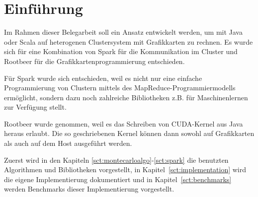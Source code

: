 \chapter{Einführung}

Im Rahmen dieser Belegarbeit soll ein Ansatz entwickelt werden, um mit Java oder Scala auf heterogenen Clustersystem mit Grafikkarten zu rechnen. Es wurde sich für eine Kombination von Spark für die Kommunikation im Cluster und Rootbeer für die Grafikkartenprogrammierung entschieden.

Für Spark wurde sich entschieden, weil es nicht nur eine einfache Programmierung von Clustern mittels des MapReduce-Programmiermodells ermöglicht, sondern dazu noch zahlreiche Bibliotheken z.B. für Maschinenlernen zur Verfügung stellt.

Rootbeer wurde genommen, weil es das Schreiben von CUDA-Kernel aus Java heraus erlaubt. Die so geschriebenen Kernel können dann sowohl auf Grafikkarten als auch auf dem Host ausgeführt werden.

Zuerst wird in den Kapiteln \ref{sct:montecarloalgo}-\ref{sct:spark} die benutzten Algorithmen und Bibliotheken vorgestellt, in Kapitel~\ref{sct:implementation} wird die eigene Implementierung dokumentiert und in Kapitel~\ref{sct:benchmarks} werden Benchmarks dieser Implementierung vorgestellt.

